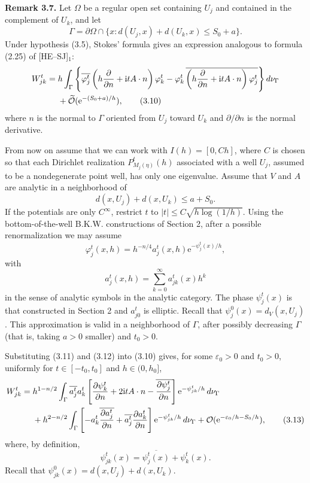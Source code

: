 \documentclass[11pt]{article}
\newcommand{\Ot}{\widetilde{\mathcal O}}
\newcommand{\OO}{\mathcal O}
\newcommand{\dd}{\,d}
\newcommand{\ii}{\mathrm{i}}
\newcommand{\e}{\mathrm{e}}
\begin{document}
\medskip
\noindent\textbf{Remark 3.7.}
Let $\Omega$ be a regular open set containing $U_j$ and contained in the complement of $U_k$, and let
\[
\Gamma=\partial\Omega\cap\{x:d(U_j,x)+d(U_k,x)\le S_0+a\}.
\]
Under hypothesis (3.5), Stokes' formula gives an expression analogous to formula (2.25) of [HE--SJ]$_1$:
\begin{align}
W_{jk}^t
={}&h\int_\Gamma\Bigg\{
\overline{\varphi_j^t}
\left(h\frac{\partial}{\partial n}+\ii tA\cdot n\right)\varphi_k^t
-\varphi_k^t\,
\overline{\left(h\frac{\partial}{\partial n}+\ii tA\cdot n\right)\varphi_j^t}
\Bigg\}\dd\nu_\Gamma
\notag\\
&+\Ot(\e^{-(S_0+a)/h}),
\tag{3.10}
\end{align}
where $n$ is the normal to $\Gamma$ oriented from $U_j$ toward $U_k$ and $\partial/\partial n$ is the normal derivative.

From now on assume that we can work with $I(h)=[0,Ch]$, where $C$ is chosen so that each Dirichlet realization $P^t_{M_j(\eta)}(h)$ associated with a well $U_j$, assumed to be a nondegenerate point well, has only one eigenvalue.
Assume that $V$ and $A$ are analytic in a neighborhood of
\[
d(x,U_j)+d(x,U_k)\le a+S_0.
\]
If the potentials are only $C^\infty$, restrict $t$ to
$|t|\le C\sqrt{h\log(1/h)}$.
Using the bottom-of-the-well B.K.W. constructions of Section 2, after a possible renormalization we may assume
\begin{equation}
\varphi_j^t(x,h)=h^{-n/4}a_j^t(x,h)\e^{-\psi_j^t(x)/h},
\tag{3.11}
\end{equation}
with
\begin{equation}
a_j^t(x,h)=\sum_{k=0}^\infty a_{jk}^t(x)h^k
\tag{3.12}
\end{equation}
in the sense of analytic symbols in the analytic category. The phase $\psi_j^t(x)$ is that constructed in Section 2 and $a_{j0}^t$ is elliptic. Recall that $\psi_j^0(x)=d_V(x,U_j)$.
This approximation is valid in a neighborhood of $\Gamma$, after possibly decreasing $\Gamma$ (that is, taking $a>0$ smaller) and $t_0>0$.

Substituting (3.11) and (3.12) into (3.10) gives, for some $\varepsilon_0>0$ and $t_0>0$, uniformly for $t\in[-t_0,t_0]$ and $h\in(0,h_0]$,
\begin{align}
W_{jk}^t
={}&h^{1-n/2}\int_\Gamma
\overline{a_j^t}a_k^t
\left[
\frac{\partial\psi_k^t}{\partial n}
+2\ii tA\cdot n
-\overline{\frac{\partial\psi_j^t}{\partial n}}
\right]
\e^{-\psi_{jk}^t/h}\dd\nu_\Gamma
\notag\\
&+h^{2-n/2}\int_\Gamma
\left[-a_k^t\overline{\frac{\partial a_j^t}{\partial n}}
+\overline{a_j^t}\frac{\partial a_k^t}{\partial n}\right]
\e^{-\psi_{jk}^t/h}\dd\nu_\Gamma
+\OO(\e^{-\varepsilon_0/h-S_0/h}),
\tag{3.13}
\end{align}
where, by definition,
\begin{equation}
\psi_{jk}^t(x)=\overline{\psi_j^t(x)}+\psi_k^t(x).
\tag{3.14}
\end{equation}
Recall that $\psi_{jk}^0(x)=d(x,U_j)+d(x,U_k)$.
\end{document}
